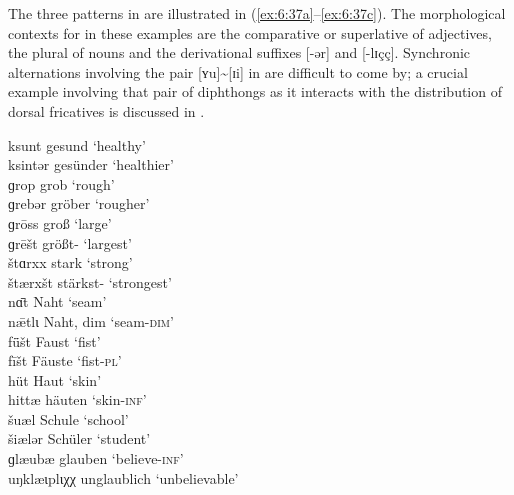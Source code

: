 The three patterns in  are illustrated in (\ref{ex:6:37a}--\ref{ex:6:37c}). The morphological contexts for  in these examples are the comparative or superlative of adjectives, the plural of nouns and the derivational suffixes [-ər] and [-lɪçç]. Synchronic alternations involving the pair [ʏu]{\textasciitilde}[ɪi] in  are difficult to come by; a crucial example involving that pair of diphthongs as it interacts with the distribution of dorsal fricatives is discussed in .


\ea%
    \label{ex:6:37}
\ea\label{ex:6:37a}  ksunt      \tab [ksunt]       \tab gesund      \tab ‘healthy’              \\
     ksintər    \tab [ksindər]     \tab gesünder    \tab ‘healthier’            \\
     ɡrop       \tab [grop]        \tab grob        \tab ‘rough’                \\
     ɡrebər     \tab [grebər]      \tab gröber      \tab ‘rougher’              \\
     ɡrōss      \tab [groːss]      \tab groß        \tab ‘large’                \\
     ɡrēšt      \tab [greːʃt]      \tab größt-      \tab ‘largest’              \\
     štɑrxx     \tab [ʃtɑrxx]      \tab stark       \tab ‘strong’               \\
     štærxšt    \tab [ʃtærxʃt]     \tab stärkst-    \tab ‘strongest’            \\
     nɑ̄t        \tab [nɑːt]        \tab Naht        \tab ‘seam’                 \\
     n\={æ}tlɩ  \tab [næːtlɪ]      \tab Naht, dim   \tab ‘seam-\textsc{dim}’    \\
\ex\label{ex:6:37b}  fǖšt       \tab [fyːʃt]       \tab Faust       \tab ‘fist’                 \\
    fīšt        \tab [fiːʃt]       \tab Fäuste      \tab ‘fist-\textsc{pl}’                \\
    hüt         \tab [hyt]         \tab Haut        \tab ‘skin’                 \\
    hittæ       \tab [hittæ]       \tab häuten      \tab ‘skin-\textsc{inf}’    \\
\ex\label{ex:6:37c}  šuæl       \tab [ʃʊæl]        \tab Schule      \tab ‘school’               \\
    šiælər      \tab [ʃɪælər]      \tab Schüler     \tab ‘student’              \\
    ɡlæubæ      \tab [glæʊbæ]      \tab glauben     \tab ‘believe-\textsc{inf}’ \\
    uŋklæɩplɩχχ \tab [uŋklæɪplɪçç] \tab unglaublich \tab ‘unbelievable’         \\
\z 
\z 

